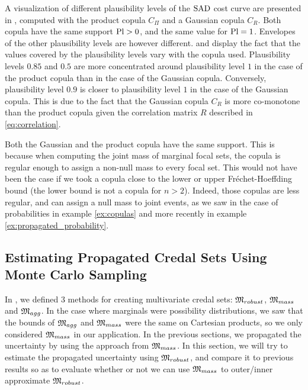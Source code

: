A visualization of different plausibility levels of the $\mathrm{SAD}$ cost curve are presented in , computed with the product copula $C_\Pi$ and a Gaussian copula $C_R$. Both copula have the same support $\mathrm{Pl}>0$, and the same value for $\mathrm{Pl}=1$. Envelopes of the other plausibility levels are however different.  and  display the fact that the values covered by the plausibility levels vary with the copula used. Plausibility levels $0.85$ and $0.5$ are more concentrated around plausibility level $1$ in the case of the product copula than in the case of the Gaussian copula. Conversely, plausibility level $0.9$ is closer to plausibility level $1$ in the case of the Gaussian copula. This is due to the fact that the Gaussian copula $C_R$ is more co-monotone than the product copula given the correlation matrix $R$ described in \cref{eq:correlation}.
\begin{remark}
    Both the Gaussian and the product copula have the same support. This is because when computing the joint mass of marginal focal sets, the copula is regular enough to assign a non-null mass to every focal set. This would not have been the case if we took a copula close to the lower or upper Fréchet-Hoeffding bound (the lower bound is not a copula for $n>2$). Indeed, those copulas are less regular, and can assign a null mass to joint events, as we saw in the case of probabilities in example \ref{ex:copulas} and more recently in example \ref{ex:propagated_probability}.
\end{remark}

\subsection{Estimating Propagated Credal Sets Using Monte Carlo Sampling}\label{sec:montecarlo}
In , we defined $3$ methods for creating multivariate credal sets: $\mathfrak{M}_{robust}$, $\mathfrak{M}_{mass}$ and $\mathfrak{M}_{agg}$. In the case where marginals were possibility distributions, we saw that the bounds of $\mathfrak{M}_{agg}$ and $\mathfrak{M}_{mass}$ were the same on Cartesian products, so we only considered $\mathfrak{M}_{mass}$ in our application. In the previous sections, we propagated the uncertainty by using the approach from $\mathfrak{M}_{mass}$. In this section, we will try to estimate the propagated uncertainty using $\mathfrak{M}_{robust}$, and compare it to previous results so as to evaluate whether or not we can use $\mathfrak{M}_{mass}$ to outer/inner approximate $\mathfrak{M}_{robust}$.

